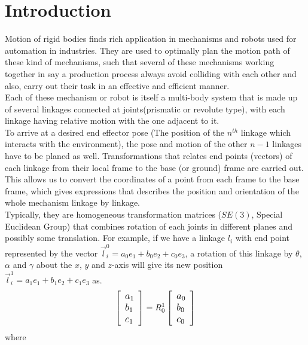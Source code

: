 \documentclass[12pt,onecolumn,letterpaper]{article} %
\begin{document}
\section{Introduction}
Motion of rigid bodies finds rich application in mechanisms and robots used for automation in industries. They are used to optimally plan the motion path of these kind of mechanisms, such that several of these mechanisms working together in say a production process always avoid colliding with each other and also, carry out their task in an effective and efficient manner. \\
Each of these mechanism or robot is itself a multi-body system that is made up of several linkages connected at joints(prismatic or revolute type), with each linkage having relative motion with the one adjacent to it.\\ To arrive at a desired end effector pose (The position of the $n^{th}$ linkage which interacts with the environment), the pose and motion of the other $n-1$ linkages have to be planed as well. Transformations that relates end points (vectors) of each linkage from their local frame to the base (or ground) frame are carried out. This allows us to convert the coordinates of a point from each frame to the base frame, which gives expressions that describes the position and orientation of the whole mechanism linkage by linkage.\\
Typically, they are homogeneous transformation matrices ($SE(3)$, Special Euclidean
Group) that combines rotation of each joints in different planes and possibly some translation. For example, if we have a linkage $l_i$ with end point represented by the vector $\vec{l}^0_i=a_0e_1+b_0e_2+c_0e_3$, a rotation of  this linkage by $\theta$, $\alpha$ and $\gamma$ about the $x$, $y$ and $z$-axis will give its new position $\vec{l}^1_i=a_1e_1+b_1e_2+c_1e_3$ as.
\begin{equation}
  \large  \left [
\begin{array}{l}
a_1  \\
b_1  \\
c_1
\end{array} \right]=\large{R^1_0}   \left [
\begin{array}{l}
a_0  \\
b_0  \\
c_0
\end{array} \right]
\end{equation}
where
\end{document}
